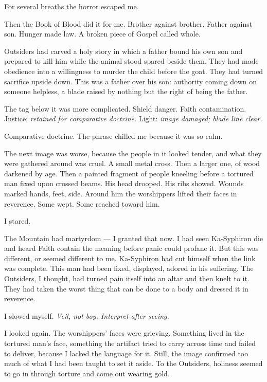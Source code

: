 For several breaths the horror escaped me.\par

Then the Book of Blood did it for me. Brother against brother. Father against son. Hunger made law. A broken piece of Gospel called whole.\par

Outsiders had carved a holy story in which a father bound his own son and prepared to kill him while the animal stood spared beside them. They had made obedience into a willingness to murder the child before the goat. They had turned sacrifice upside down. This was a father over his son: authority coming down on someone helpless, a blade raised by nothing but the right of being the father.\par

The tag below it was more complicated. Shield danger. Faith contamination. Justice: \textit{retained for comparative doctrine.} Light: \textit{image damaged; blade line clear.}\par

Comparative doctrine. The phrase chilled me because it was so calm.\par

The next image was worse, because the people in it looked tender, and what they were gathered around was cruel. A small metal cross. Then a larger one, of wood darkened by age. Then a painted fragment of people kneeling before a tortured man fixed upon crossed beams. His head drooped. His ribs showed. Wounds marked hands, feet, side. Around him the worshippers lifted their faces in reverence. Some wept. Some reached toward him.\par

I stared.\par

The Mountain had martyrdom --- I granted that now. I had seen Ka-Syphiron die and heard Faith contain the meaning before panic could profane it. But this was different, or seemed different to me. Ka-Syphiron had cut himself when the link was complete. This man had been fixed, displayed, adored in his suffering. The Outsiders, I thought, had turned pain itself into an altar and then knelt to it. They had taken the worst thing that can be done to a body and dressed it in reverence.\par

I slowed myself. \textit{Veil, not boy. Interpret after seeing.}\par

I looked again. The worshippers' faces were grieving. Something lived in the tortured man's face, something the artifact tried to carry across time and failed to deliver, because I lacked the language for it. Still, the image confirmed too much of what I had been taught to set it aside. To the Outsiders, holiness seemed to go in through torture and come out wearing gold.\par

